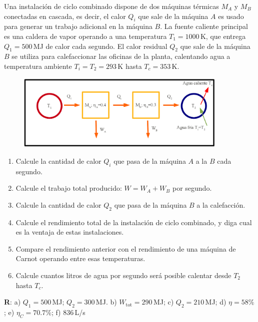\documentclass[a4paper,12pt]{article}
\begin{document}
\begin{enumerate}
		Una instalación de ciclo combinado dispone de dos máquinas térmicas
		$M_A$ y $M_B$ conectadas en cascada, es decir, el calor $Q_i$ que sale
		de la máquina $A$ es usado para generar un trabajo adicional en la
		máquina $B$. La fuente caliente principal es una caldera de vapor
		operando a una temperatura $T_1=1000$\,K, que entrega $Q_1=500$\,MJ de
		calor cada segundo. El calor residual $Q_2$ que sale de la máquina $B$
		se utiliza para calefaccionar las oficinas de la planta, calentando
		agua a temperatura ambiente $T_i=T_2=293$\,K hasta $T_c=353$\,K.
		\begin{figure}[hhhhhb!]
			\centering
			\includegraphics[width=0.9\textwidth]{maq2.png}
		\end{figure}
		\begin{enumerate}
			\item Calcule la cantidad de calor $Q_i$ que pasa de la máquina $A$
				a la $B$ cada segundo.
			\item Calcule el trabajo total producido: $W=W_A+W_B$ por segundo.
			\item Calcule la cantidad de calor $Q_2$ que pasa de la máquina $B$
				a la calefacción.
			\item Calcule el rendimiento total de la instalación de ciclo
				combinado, y diga cual es la ventaja de estas instalaciones.
			\item Compare el rendimiento anterior con el rendimiento de una
				máquina de Carnot operando entre esas temperaturas.
			\item Calcule cuantos litros de agua por segundo será posible
				calentar desde $T_2$ hasta $T_c$.
		\end{enumerate}
		{\bf{R}}: a) $Q_1=500$\,MJ; $Q_2=300$\,MJ. b) $W_{\mathrm{tot}}=290$\,MJ; c) $Q_2=210$\,MJ; d) $\eta=58\%$; e) $\eta_C=70.7\%$; f) $836$\,L/s
		
\end{enumerate}
\end{document}
